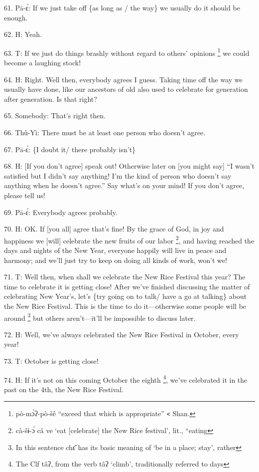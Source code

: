 61. Pā-ɛ́: If we just take off \{as long as / the way\} we usually do it should
be enough.

62. H: Yeah.

63. T: If we just do things brashly without regard to others' opinions \footnote{pò-mɔ̀ʔ-pò-šê ``exceed that which is appropriate'' \texttt{<} Shan.} we
could become a laughing stock!

64. H: Right.  Well then, everybody agrees I guess.  Taking time off the way we
usually have done, like our ancestors of old also used to celebrate for generation
after generation.  Is that right?

65. Somebody: That's right then.

66. Thû-Yì: There must be at least one person who doesn't agree.

67. Pā-ɛ́: \{I doubt it/ there probably isn't\}

68. H: [If you don't agree] speak out!  Otherwise later on [you might say] ``I
wasn't satisfied but I didn't say anything! I'm the kind of person who doesn't
say anything when he doesn't agree.'' Say what's on your mind!  If you don't agree,
please tell us!

69. Pā-ɛ́: Everybody agrees probably.

70. H: OK. If [you all] agree that's fine!  By the grace of God, in joy and happiness
we [will] celebrate the new fruits of our labor \footnote{cà-šɨ-ɔ́ câ ve `eat [celebrate] the New Rice festival', lit., ``eating}, and having reached the days
and nights of the New Year, everyone happily will live in peace and harmony; and
we'll just try to keep on doing all kinds of work, won't we!

71. T: Well then, when shall we celebrate the New Rice Festival this year?  The
time to celebrate it is getting close!  After we've finished discussing the matter
of celebrating New Year's, let's \{try going on to talk/ have a go at talking\}
about the New Rice Festival.  This is the time to do it---otherwise some people
will be around \footnote{In this sentence chɛ̂ has its basic meaning of `be in a place; stay', rather} but others aren't---it'll be impossible to discuss later.

72. H: Well, we've always celebrated the New Rice Festival in October, every year!

73. T: October is getting close!

74. H: If it's not on this coming October the eighth \footnote{The Clf tâʔ, from the verb tâʔ `climb', traditionally referred to days}, we've celebrated it
in the past on the 4th, the New Rice Festival.

